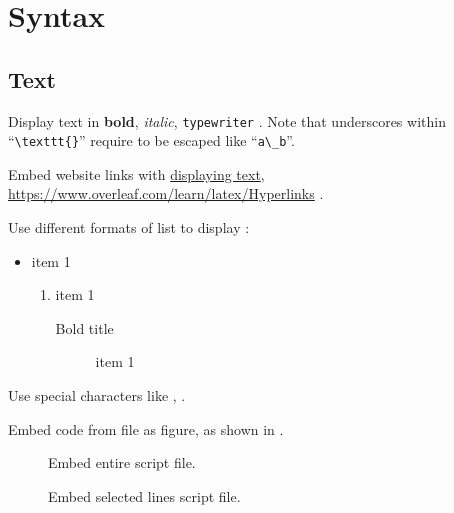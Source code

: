 \section{Syntax}

\subsection{Text}

Display text in \textbf{bold}, \textit{italic}, \texttt{typewriter} \cite{overleaf_font}. Note that underscores within \enquote{\texttt{\textbackslash texttt\{\}}} require to be escaped like \enquote{\texttt{a\textbackslash\_b}}.

Embed website links with \href{https://www.overleaf.com/learn/latex/Hyperlinks}{displaying text}, \url{https://www.overleaf.com/learn/latex/Hyperlinks} \cite{overleaf_link}.

Use different formats of list to display \cite{overleaf_list}:
\begin{itemize}
    \item item 1
        \begin{enumerate}
            \item item 1
                \begin{description}
                    \item[Bold title] item 1
                \end{description}
        \end{enumerate}
\end{itemize}

Use special characters like ,  \cite{pifont}.

Embed code from file as figure, as shown in .
\begin{figure}[H]

\caption{Embed entire script file.}
\label{fig:embed_ef}
\end{figure}
\begin{figure}[H]

\caption{Embed selected lines script file.}
\label{fig:embed_pf}
\end{figure}

